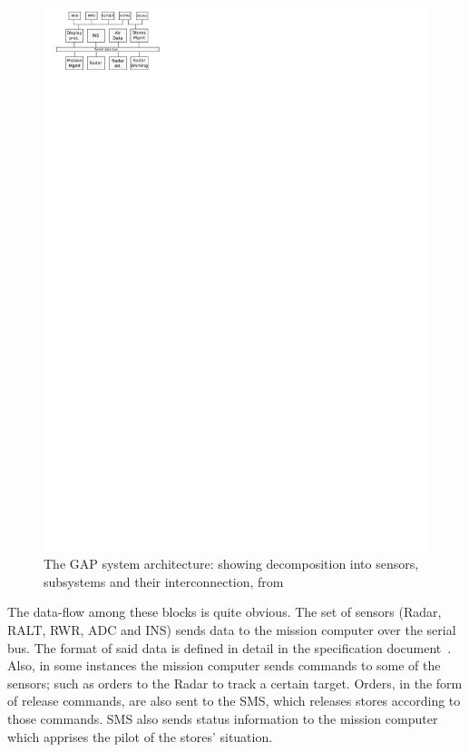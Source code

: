 \begin{figure}[htbp]
\centering
\includegraphics[scale=1.4]{figs/GAP_sys_arch}
\caption{The GAP system architecture: {\normalsize showing
  decomposition into sensors, subsystems and their interconnection,
  from~\cite{locke@rtss91}}}
\label{fig:GAP}
\end{figure}

The data-flow among these blocks is quite obvious. The set of sensors
(Radar, RALT, RWR, ADC and INS) sends data to the mission computer
over the serial bus. The format of said data is defined in detail in
the specification document~\cite{locke@sei90}. Also, in some instances
the mission computer sends commands to some of the sensors; such as
orders to the Radar to track a certain target. Orders, in the form of
release commands, are also sent to the SMS, which releases stores
according to those commands. SMS also sends status information to the
mission computer which apprises the pilot of the stores' situation.

